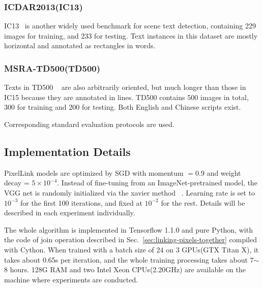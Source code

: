 \documentclass[letterpaper]{article} \usepackage{aaai18}  \usepackage{times}  \usepackage{helvet}  \usepackage{courier}  \usepackage{url}  \usepackage{graphicx}
\begin{document}
	\subsubsection{ICDAR2013(IC13)}
	IC13~\cite{Karatzas2013ICDAR} is another widely used benchmark for scene text detection, containing 229 images for training, and 233 for testing. Text instances in this dataset are mostly horizontal and annotated as rectangles in words.
	
	\subsubsection{MSRA-TD500(TD500)}
	Texts in TD500 ~\cite{Yao2012TD500} are also arbitrarily oriented, but much longer than those in IC15 because they are annotated in lines. TD500 contains 500 images in total, 300 for training and 200 for testing. Both English and Chinese scripts exist.
	
	
	Corresponding standard evaluation protocols are used.
	\subsection{Implementation Details}
	PixelLink models are optimized by SGD with momentum $=0.9$ and weight decay = $5\times10^{-4}$. Instead of fine-tuning from an ImageNet-pretrained model, the VGG net is randomly initialized via the xavier method ~\cite{Glorot2010Xavier}. Learning rate is set to $10^{-3}$ for the first 100 iterations, and fixed at $10^{-2}$ for the rest. Details will be described in each experiment individually.
	
	The whole algorithm is implemented in Tensorflow 1.1.0 and pure Python, with the code of join operation described in Sec.~\ref{sec:linking-pixels-together} compiled with Cython. When trained with a batch size of 24 on 3 GPUs(GTX Titan X), it takes about 0.65s per iteration, and the whole training processing takes about 7$\sim$8 hours. 128G RAM and two Intel Xeon CPUs(2.20GHz) are available on the machine where experiments are conducted.
	
	
\end{document}
